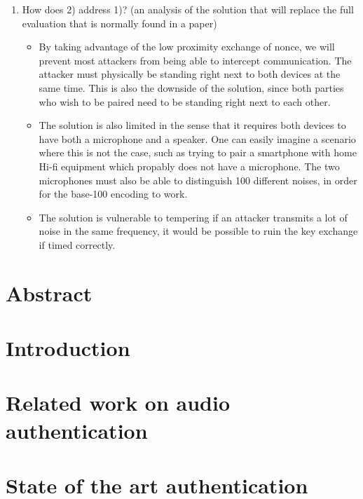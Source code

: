 \documentclass[12pt]{article}
\begin{document}
\begin{enumerate}
    \item How does 2) address 1)?  (an analysis of the solution that will replace the full evaluation that is normally found in a paper)

    \begin{itemize}
        \item By taking advantage of the low proximity exchange of nonce, we will prevent most attackers from being able to intercept communication. The attacker must physically be standing right next to both devices at the same time.
        This is also the downside of the solution, since both parties who wish to be paired need to be standing right next to each other.
        \item The solution is also limited in the sense that it requires both devices to have both a microphone and a speaker. One can easily imagine a scenario where this is not the case, such as trying to pair a smartphone with home Hi-fi equipment which propably does not have a microphone. The two microphones must also be able to distinguish 100 different noises, in order for the base-100 encoding to work.
        \item The solution is vulnerable to tempering if an attacker transmits a lot of noise in the same frequency, it would be possible to ruin the key exchange if timed correctly.
    \end{itemize}

\end{enumerate}

\newpage

\section{Abstract}
\label{sec:Abstract}

\newpage

\section{Introduction}
\label{sec:Introduction}

\newpage

\section{Related work on audio authentication}
\label{sec:Related work on audio authentication}

\section{State of the art authentication}
\label{sec:State of the art authentication}
\end{document}
